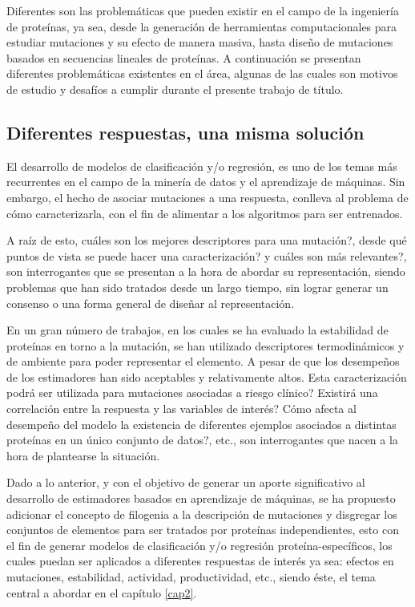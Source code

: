 Diferentes son las problemáticas que pueden existir en el campo de la ingeniería de proteínas, ya sea, desde la generación de herramientas computacionales para estudiar mutaciones y su efecto de manera masiva, hasta diseño de mutaciones basados en secuencias lineales de proteínas. A continuación se presentan diferentes problemáticas existentes en el área, algunas de las cuales son motivos de estudio y desafíos a cumplir durante el presente trabajo de título.

\subsection{Diferentes respuestas, una misma solución}

El desarrollo de modelos de clasificación y/o regresión, es uno de los temas más recurrentes en el campo de la minería de datos y el aprendizaje de máquinas. Sin embargo, el hecho de asociar mutaciones a una respuesta, conlleva al problema de cómo caracterizarla, con el fin de alimentar a los algoritmos para ser entrenados. 

A raíz de esto, cuáles son los mejores descriptores para una mutación?, desde qué puntos de vista se puede hacer una caracterización? y cuáles son más relevantes?, son interrogantes que se presentan a la hora de abordar su representación, siendo problemas que han sido tratados desde un largo tiempo, sin lograr generar un consenso o una forma general de diseñar al representación. 

En un gran número de trabajos, en los cuales se ha evaluado la estabilidad de proteínas en torno a la mutación, se han utilizado descriptores termodinámicos y de ambiente para poder representar el elemento. A pesar de que los desempeños de los estimadores han sido aceptables y relativamente altos. Esta caracterización podrá ser utilizada para mutaciones asociadas a riesgo clínico? Existirá una correlación entre la respuesta y las variables de interés? Cómo afecta al desempeño del modelo la existencia de diferentes ejemplos asociados a distintas proteínas en un único conjunto de datos?, etc., son interrogantes que nacen a la hora de plantearse la situación.

Dado a lo anterior, y con el objetivo de generar un aporte significativo al desarrollo de estimadores basados en aprendizaje de máquinas, se ha propuesto adicionar el concepto de filogenia a la descripción de mutaciones y disgregar los conjuntos de elementos para ser tratados por proteínas independientes, esto con el fin de generar modelos de clasificación y/o regresión proteína-específicos, los cuales puedan ser aplicados a diferentes respuestas de interés ya sea: efectos en mutaciones, estabilidad, actividad, productividad, etc., siendo éste, el tema central a abordar en el capítulo \ref{cap2}.
 
